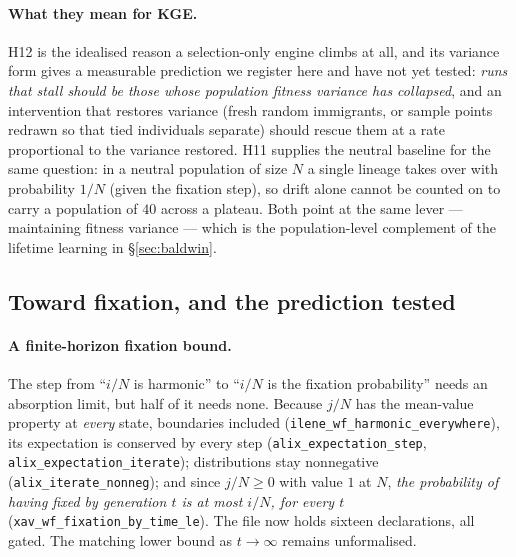 \documentclass[11pt,a4paper]{article}
\theoremstyle{definition}
\theoremstyle{remark}
\begin{document}
\paragraph{What they mean for KGE.} H12 is the idealised reason a
selection-only engine climbs at all, and its variance form gives a measurable
prediction we register here and have not yet tested: \emph{runs that stall
should be those whose population fitness variance has collapsed}, and an
intervention that restores variance (fresh random immigrants, or sample points
redrawn so that tied individuals separate) should rescue them at a rate
proportional to the variance restored. H11 supplies the neutral baseline for
the same question: in a neutral population of size $N$ a single lineage takes
over with probability $1/N$ (given the fixation step), so drift alone cannot be
counted on to carry a population of $40$ across a plateau. Both point at the
same lever --- maintaining fitness variance --- which is the population-level
complement of the lifetime learning in \S\ref{sec:baldwin}.

\subsection{Toward fixation, and the prediction tested}\label{sec:popgen-tested}

\paragraph{A finite-horizon fixation bound.} The step from ``$i/N$ is harmonic''
to ``$i/N$ is the fixation probability'' needs an absorption limit, but half of
it needs none. Because $j/N$ has the mean-value property at \emph{every} state,
boundaries included (\texttt{ilene\_wf\_harmonic\_everywhere}), its expectation
is conserved by every step (\texttt{alix\_expectation\_step},
\texttt{alix\_expectation\_iterate}); distributions stay nonnegative
(\texttt{alix\_iterate\_nonneg}); and since $j/N\ge 0$ with value $1$ at $N$,
\emph{the probability of having fixed by generation $t$ is at most $i/N$, for
every $t$} (\texttt{xav\_wf\_fixation\_by\_time\_le}). The file now holds
sixteen declarations, all gated. The matching lower bound as $t\to\infty$
remains unformalised.

\end{document}
